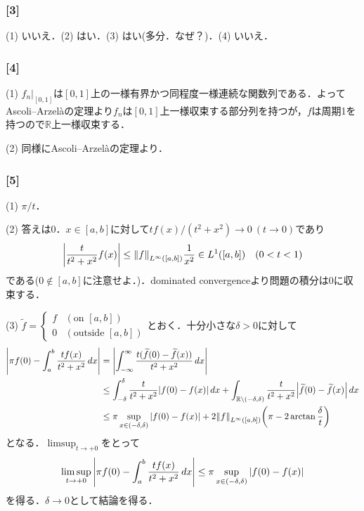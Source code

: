 \documentclass[a4j]{ltjsarticle}
\newcommand{\Rset}{\mathbb{R}}
\newcommand{\1}{\mathbbm{1}}
\numberwithin{equation}{section}
\theoremstyle{definition}
\begin{document}
\subsubsection*{[3]}
(1) いいえ．(2) はい．(3) はい(多分．なぜ？)．(4) いいえ．

\subsubsection*{[4]}
(1) $f_{n}|_{[0,1]}$は$[0,1]$上の一様有界かつ同程度一様連続な関数列である．よってAscoli--Arzelàの定理より$f_n$は$[0,1]$上一様収束する部分列を持つが，$f$は周期1を持つので$\Rset$上一様収束する．

(2) 同様にAscoli--Arzelàの定理より．

\subsubsection*{[5]}
(1) $\pi/t$．

(2) 答えは0．$x\in[a,b]$に対して$tf(x)/(t^2+x^2)\to0\ (t\to0)$であり
\begin{equation}
    \abs{\frac{t}{t^2+x^2}f(x)}\leq \norm{f}_{L^\infty([a,b])}\frac{1}{x^2} \in L^1([a,b])\quad (0<t<1) 
\end{equation}
である($0\notin [a,b]$に注意せよ．)．dominated convergenceより問題の積分は0に収束する．

(3) $\widetilde{f}=\begin{cases}
    f & (\text{on $[a,b]$})\\
    0 & (\text{outside $[a,b]$})
\end{cases}$とおく．十分小さな$\delta>0$に対して
\begin{align}
    \abs{\pi f(0)-\int_{a}^b \frac{tf(x)}{t^2+x^2}\,dx}
    &=\abs{\int_{-\infty}^{\infty}\frac{t(\widetilde{f}(0)-\widetilde{f}(x))}{t^2+x^2}\,dx}\\
    &\leq \int_{-\delta}^{\delta}\frac{t}{t^2+x^2}\abs{f(0)-f(x)}\,dx + \int_{\Rset\setminus(-\delta,\delta)}\frac{t}{t^2+x^2}\abs{\widetilde{f}(0)-\widetilde{f}(x)}\,dx\\
    &\leq \pi\sup_{x\in (-\delta,\delta)}\abs{f(0)-f(x)}+2\norm{f}_{L^\infty([a,b])}\qty(\pi-2\arctan\frac{\delta}{t})
\end{align}
となる．$\limsup_{t\to+0}$をとって
\begin{equation}
    \limsup_{t\to +0}\abs{\pi f(0)-\int_{a}^b \frac{tf(x)}{t^2+x^2}\,dx}\leq \pi\sup_{x\in(-\delta,\delta)}\abs{f(0)-f(x)}
\end{equation}
を得る．$\delta\to0$として結論を得る．
\end{document}
